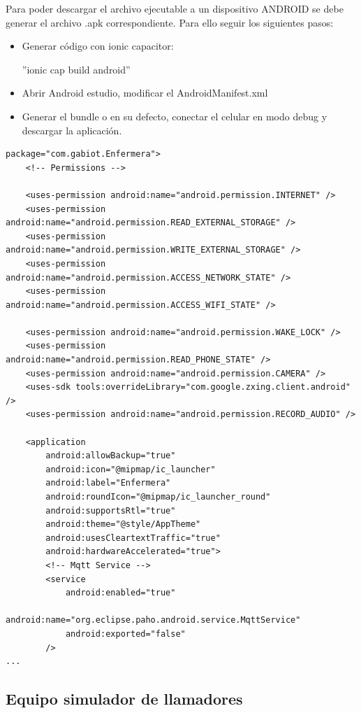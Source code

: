 Para poder descargar el archivo ejecutable a un dispositivo ANDROID se debe generar el archivo .apk correspondiente. Para ello seguir los siguientes pasos:

\begin{itemize}
\item Generar código con ionic capacitor:

''ionic cap build android''
\item Abrir Android estudio, modificar el AndroidManifest.xml
\item Generar el bundle o en su defecto, conectar el celular en modo debug y descargar la aplicación.
\end{itemize}
\pagebreak


\begin{lstlisting}[label=cod:AndroidMan,caption=Modificaciones al Android Manifest.]  % Start your code-block
package="com.gabiot.Enfermera">
    <!-- Permissions -->

    <uses-permission android:name="android.permission.INTERNET" />
    <uses-permission android:name="android.permission.READ_EXTERNAL_STORAGE" />
    <uses-permission android:name="android.permission.WRITE_EXTERNAL_STORAGE" />
    <uses-permission android:name="android.permission.ACCESS_NETWORK_STATE" />
    <uses-permission android:name="android.permission.ACCESS_WIFI_STATE" />

    <uses-permission android:name="android.permission.WAKE_LOCK" />
    <uses-permission android:name="android.permission.READ_PHONE_STATE" />
    <uses-permission android:name="android.permission.CAMERA" />
    <uses-sdk tools:overrideLibrary="com.google.zxing.client.android" />
    <uses-permission android:name="android.permission.RECORD_AUDIO" />

    <application
        android:allowBackup="true"
        android:icon="@mipmap/ic_launcher"
        android:label="Enfermera"
        android:roundIcon="@mipmap/ic_launcher_round"
        android:supportsRtl="true"
        android:theme="@style/AppTheme"
        android:usesCleartextTraffic="true"
        android:hardwareAccelerated="true">
        <!-- Mqtt Service -->
        <service
            android:enabled="true"
            android:name="org.eclipse.paho.android.service.MqttService"
            android:exported="false"
        />
...

\end{lstlisting}
\pagebreak
\subsection{Equipo simulador de llamadores}

